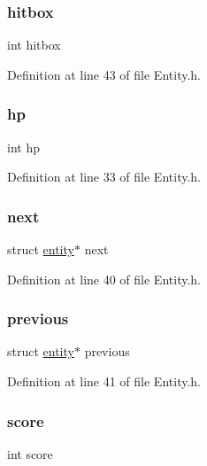 \subsubsection{\texorpdfstring{hitbox}{hitbox}}
{\footnotesize\ttfamily int hitbox}



Definition at line 43 of file Entity.\+h.

\mbox{\label{structentity_a9aa790f93d2d067a4f5608fdb8409f94}} 
\subsubsection{\texorpdfstring{hp}{hp}}
{\footnotesize\ttfamily int hp}



Definition at line 33 of file Entity.\+h.

\mbox{\label{structentity_a003db4878d2160d7c60c600d716094b2}} 
\subsubsection{\texorpdfstring{next}{next}}
{\footnotesize\ttfamily struct \hyperlink{structentity}{entity}$\ast$ next}



Definition at line 40 of file Entity.\+h.

\mbox{\label{structentity_abdec4e7d3433b984eebbdbb4606e293a}} 
\subsubsection{\texorpdfstring{previous}{previous}}
{\footnotesize\ttfamily struct \hyperlink{structentity}{entity}$\ast$ previous}



Definition at line 41 of file Entity.\+h.

\mbox{\label{structentity_aef160b7437d94056f1dc59646cd5b87d}} 
\subsubsection{\texorpdfstring{score}{score}}
{\footnotesize\ttfamily int score}



